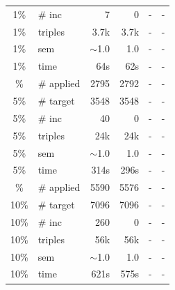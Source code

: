 \documentclass[a4paper,UKenglish,cleveref, autoref, thm-restate]{tgdk-v2021}
\begin{document}
\begin{table}[ht]
\begin{minipage}[t]{0.49\linewidth}
\begin{tabular}{c l | r r r r}
1\% & \# inc & 7 & 0 & - & - \\
1\% & triples & 3.7k & 3.7k & - & - \\
1\% & sem & $\sim$1.0 & 1.0 & - & - \\
1\% & time & 64s & 62s & - & - \\
\addlinespace
5\% & \# applied & 2795 & 2792 & - & - \\
5\% & \# target & 3548 & 3548 & - & - \\
5\% & \# inc & 40 & 0 & - & - \\
5\% & triples & 24k & 24k & - & - \\
5\% & sem & $\sim$1.0 & 1.0 & - & - \\
5\% & time & 314s & 296s & - & - \\
\addlinespace
10\% & \# applied & 5590 & 5576 & - & - \\
10\% & \# target & 7096 & 7096 & - & - \\
10\% & \# inc & 260 & 0 & - & - \\
10\% & triples & 56k & 56k & - & - \\
10\% & sem & $\sim$1.0 & 1.0 & - & - \\
10\% & time & 621s & 575s & - & - \\
\bottomrule
\end{tabular}
\end{minipage}%
\end{table}
\end{document}

